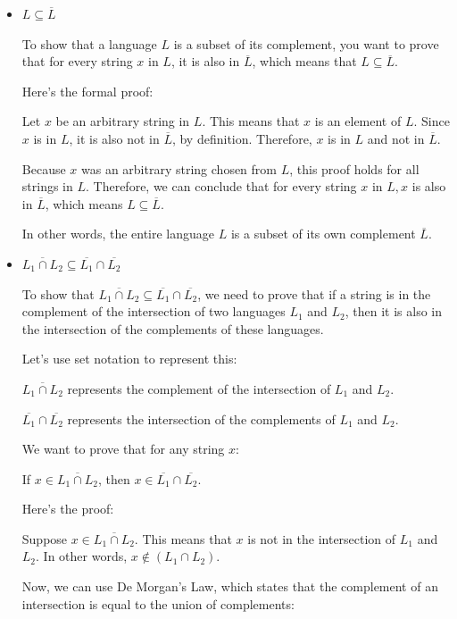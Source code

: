 \documentclass{article}
\begin{document}
\begin{itemize}
  \item $L \subseteq \overline{L}$
  
  To show that a language $L$ is a subset of its complement, you want to prove that for every string $x$ in $L$, it is also in $\overline{L}$, which means that $L \subseteq \overline{L}$.

  Here's the formal proof:

  Let $x$ be an arbitrary string in $L$. This means that $x$ is an element of $L$. Since $x$ is in $L$, it is also not in $\overline{L}$, by definition. Therefore, $x$ is in $L$ and not in $\overline{L}$.

  Because $x$ was an arbitrary string chosen from $L$, this proof holds for all strings in $L$. Therefore, we can conclude that for every string $x$ in $L, x$ is also in $\overline{L}$, which means $L \subseteq \overline{L}$.

  In other words, the entire language $L$ is a subset of its own complement $\overline{L}$.

  \item $\overline{ L_1 \cap L_2 } \subseteq \overline{L_1} \cap \overline{L_2}$
  
  To show that $\overline{L_1 \cap L_2} \subseteq \overline{L_1} \cap \overline{L_2}$, we need to prove that if a string is in the complement of the intersection of two languages $L_1$ and $L_2$, then it is also in the intersection of the complements of these languages.

  Let's use set notation to represent this:
  
  $\overline{L_1 \cap L_2}$ represents the complement of the intersection of $L_1$ and $L_2$.
  
  $\overline{L_1} \cap \overline{L_2}$ represents the intersection of the complements of $L_1$ and $L_2$.
  
  We want to prove that for any string $x$:
  
  If $x \in \overline{L_1 \cap L_2}$, then $x \in \overline{L_1} \cap \overline{L_2}$.
  
  Here's the proof:
  
  Suppose $x \in \overline{L_1 \cap L_2}$. This means that $x$ is not in the intersection of $L_1$ and $L_2$. In other words, $x \notin (L_1 \cap L_2)$.
  
  Now, we can use De Morgan's Law, which states that the complement of an intersection is equal to the union of complements:
  

\end{itemize}
\end{document}
